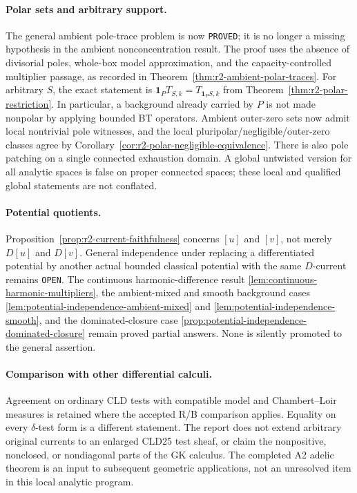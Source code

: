 \documentclass[11pt,a4paper]{article}
\numberwithin{equation}{section}
\theoremstyle{definition}
\theoremstyle{remark}
\begin{document}
\paragraph{Polar sets and arbitrary support.}
The general ambient pole-trace problem is now \texttt{PROVED}; it is
no longer a missing hypothesis in the ambient nonconcentration result.
The proof uses the absence of divisorial poles, whole-box model
approximation, and the capacity-controlled multiplier passage, as
recorded in Theorem~\ref{thm:r2-ambient-polar-traces}. For arbitrary
$S$, the exact statement is
$\mathbf1_P T_{S,k}=T_{\mathbf1_PS,k}$ from
Theorem~\ref{thm:r2-polar-restriction}. In particular, a background
already carried by $P$ is not made nonpolar by applying bounded BT
operators. Ambient outer-zero sets now admit local nontrivial pole
witnesses, and the local pluripolar/negligible/outer-zero classes agree
by Corollary~\ref{cor:r2-polar-negligible-equivalence}. There is also
pole patching on a single connected exhaustion domain. A global
untwisted version for all analytic spaces is false on proper connected
spaces; these local and qualified global statements are not conflated.

\paragraph{Potential quotients.}
Proposition~\ref{prop:r2-current-faithfulness} concerns $[u]$ and
$[v]$, not merely $D[u]$ and $D[v]$. General independence under
replacing a differentiated potential by another actual bounded
classical potential with the same $D$-current remains \texttt{OPEN}.
The continuous harmonic-difference result
\ref{lem:continuous-harmonic-multipliers}, the ambient-mixed and smooth
background cases \ref{lem:potential-independence-ambient-mixed} and
\ref{lem:potential-independence-smooth}, and the dominated-closure
case \ref{prop:potential-independence-dominated-closure} remain proved
partial answers. None is silently promoted to the general assertion.

\paragraph{Comparison with other differential calculi.}
Agreement on ordinary CLD tests with compatible model and
Chambert--Loir measures is retained where the accepted R/B comparison
applies. Equality on every $\delta$-test form is a different statement.
The report does not extend arbitrary original currents to an enlarged
CLD25 test sheaf, or claim the nonpositive, nonclosed, or nondiagonal
parts of the GK calculus. The completed A2 adelic theorem is an input
to subsequent geometric applications, not an unresolved item in this
local analytic program.
\end{document}
